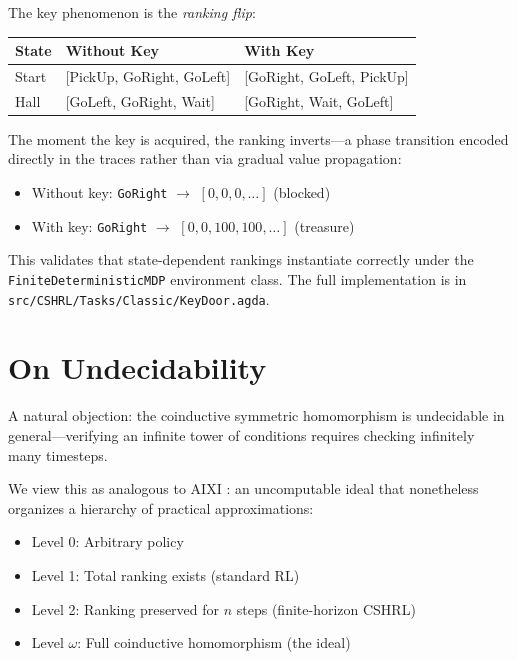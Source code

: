 \documentclass[9pt,a4paper]{article}
\newcommand{\fpath}[1]{\nolinkurl{#1}}
\theoremstyle{plain}
\theoremstyle{definition}
\theoremstyle{remark}
\begin{document}
\noindent The key phenomenon is the \emph{ranking flip}:

\begin{center}
\small
\begin{tabular}{l|l|l}
\textbf{State} & \textbf{Without Key} & \textbf{With Key} \\
\hline
Start & [PickUp, GoRight, GoLeft] & [GoRight, GoLeft, PickUp] \\
Hall  & [GoLeft, GoRight, Wait] & [GoRight, Wait, GoLeft] \\
\end{tabular}
\end{center}

The moment the key is acquired, the ranking inverts---a phase transition encoded directly in the traces rather than via gradual value propagation:
\begin{itemize}
\item Without key: \texttt{GoRight} $\to$ $[0, 0, 0, \ldots]$ (blocked)
\item With key: \texttt{GoRight} $\to$ $[0, 0, 100, 100, \ldots]$ (treasure)
\end{itemize}

\begin{sloppypar}
\noindent This validates that state-dependent rankings instantiate correctly under the \texttt{FiniteDeterministicMDP} environment class.  The full implementation is in \fpath{src/CSHRL/Tasks/Classic/KeyDoor.agda}.
\end{sloppypar}

\section{On Undecidability}

A natural objection: the coinductive symmetric homomorphism is undecidable in general---verifying an infinite tower of conditions requires checking infinitely many timesteps.

We view this as analogous to AIXI \cite{Hutter2005}: an uncomputable ideal that nonetheless organizes a hierarchy of practical approximations:

\begin{itemize}
\item Level 0: Arbitrary policy
\item Level 1: Total ranking exists (standard RL)
\item Level 2: Ranking preserved for $n$ steps (finite-horizon CSHRL)
\item Level $\omega$: Full coinductive homomorphism (the ideal)
\end{itemize}
\end{document}
